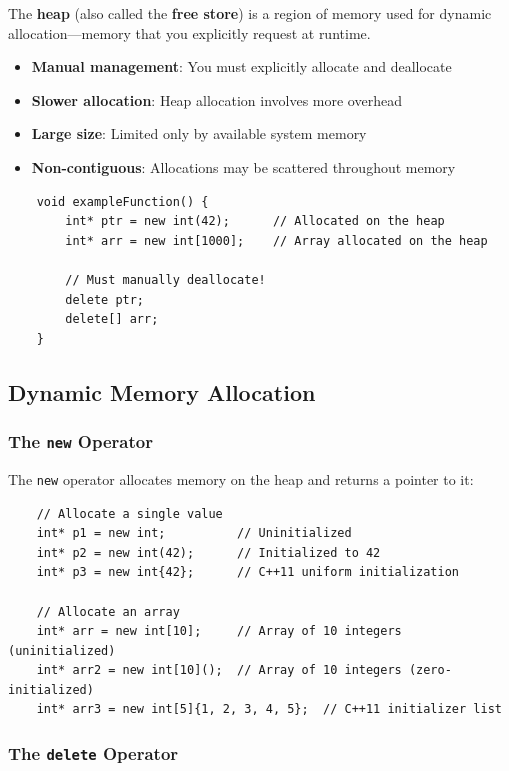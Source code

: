 The \textbf{heap} (also called the \textbf{free store}) is a region of memory used for dynamic allocation—memory that you explicitly request at runtime.

\begin{itemize}
	\item \textbf{Manual management}: You must explicitly allocate and deallocate
	\item \textbf{Slower allocation}: Heap allocation involves more overhead
	\item \textbf{Large size}: Limited only by available system memory
	\item \textbf{Non-contiguous}: Allocations may be scattered throughout memory
\end{itemize}

\begin{lstlisting}
	void exampleFunction() {
		int* ptr = new int(42);      // Allocated on the heap
		int* arr = new int[1000];    // Array allocated on the heap
		
		// Must manually deallocate!
		delete ptr;
		delete[] arr;
	}
\end{lstlisting}

\subsection{Dynamic Memory Allocation}

\subsubsection{The \texttt{new} Operator}

The \texttt{new} operator allocates memory on the heap and returns a pointer to it:

\begin{lstlisting}
	// Allocate a single value
	int* p1 = new int;          // Uninitialized
	int* p2 = new int(42);      // Initialized to 42
	int* p3 = new int{42};      // C++11 uniform initialization
	
	// Allocate an array
	int* arr = new int[10];     // Array of 10 integers (uninitialized)
	int* arr2 = new int[10]();  // Array of 10 integers (zero-initialized)
	int* arr3 = new int[5]{1, 2, 3, 4, 5};  // C++11 initializer list
\end{lstlisting}

\subsubsection{The \texttt{delete} Operator}

